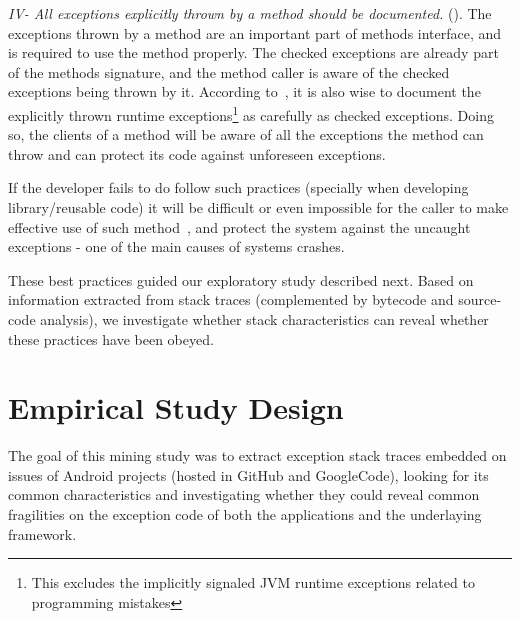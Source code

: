 \documentclass[conference]{IEEEtran}
\begin{document}

\emph{IV- All exceptions explicitly thrown by a method should be documented.}
(\cite{mandrioli1992advances,gosling2000java,wirfs2006toward,bloch2008effective}).
The exceptions thrown by a method are an important part of methods interface,
and is required to use the method properly. The checked exceptions are already
part of the  methods signature, and the method caller is aware of the checked
exceptions being thrown by it. According to~\cite{bloch2008effective}, it is
also wise to document the explicitly thrown runtime exceptions\footnote{This
excludes the implicitly signaled JVM runtime exceptions related to programming
mistakes} as carefully as checked exceptions. Doing so, the clients of a method
will be aware of all the exceptions the method can throw and can protect its code
against unforeseen exceptions. 

If the developer fails to do follow such practices (specially when developing 
library/reusable code) it will be difficult or even impossible for the caller to 
make effective use of such method~\cite{wirfs2006toward, bloch2008effective},
and protect the system against the uncaught exceptions - one of the main causes of 
systems crashes. 

These best practices guided our exploratory study described next.
Based on information extracted from stack traces (complemented by
bytecode and source-code analysis), we investigate whether stack characteristics
can reveal whether these practices have been obeyed.



\section{Empirical Study Design}
\label{sec:study}


The goal of this mining study was to extract exception stack traces embedded on issues of Android projects 
(hosted in GitHub and GoogleCode), looking for its 
common characteristics and investigating whether
 they could reveal common fragilities on the exception code of both the 
applications and the underlaying  framework. 
\end{document}
